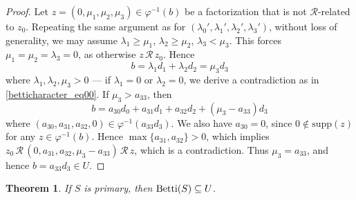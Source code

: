 \documentclass[12pt]{article}
\newtheorem{thm}{Theorem}[section]
\theoremstyle{remark}
\begin{document}
\begin{proof}
  
    Let $z=(0,\mu_1, \mu_2,  \mu_3) \in \varphi^{-1}(b)$ be a factorization that is not $\mathcal{R}$-related to $z_0$. Repeating the same argument as for $(\lambda_0',\lambda_1',\lambda_2', \lambda_3')$, without loss of generality, we may assume $\lambda_1 \geq \mu_1$, $\lambda_2 \geq \mu_2$, $\lambda_3 < \mu_3$. This forces $\mu_1= \mu_2= \lambda_3 =0$, as otherwise $z \, \mathcal{R} \, z_0$. Hence
    \begin{equation}\label{betticharacter_eq03}
       b= \lambda_1d_1 + \lambda_2d_2   =  \mu_3d_3
    \end{equation}
    where $\lambda_1, \lambda_2, \mu_3> 0$ --- if $\lambda_1 =0$ or $\lambda_2 = 0$, we derive a contradiction as in \eqref{betticharacter_eq00}.
    If $ \mu_3 > a_{33}$, then 
    \begin{equation}
        b  =  a_{30}d_0 + a_{31}d_1 + a_{32}d_2 +  (\mu_3-a_{33})d_3
    \end{equation}
    where $(a_{30},a_{31},a_{32},0) \in \varphi^{-1}(a_{33}d_3)$. We also have $a_{30} = 0$, since $0 \notin \text{supp}(z)$ for any $z \in \varphi^{-1}(b)$. Hence $\max \{a_{31},a_{32}\} > 0$, which implies $z_0 \, \mathcal{R} \, (0,a_{31},a_{32},\mu_3-a_{33}) \, \mathcal{R} \,z$, which is a contradiction. Thus $\mu_3 = a_{33}$, and hence $b = a_{33}d_3 \in U$.
\end{proof}    


\begin{thm}\label{theorembettifind_primary}
If $S$ is primary, then $\textup{Betti}(S) \subseteq U$. 
\end{thm}
\end{document}
